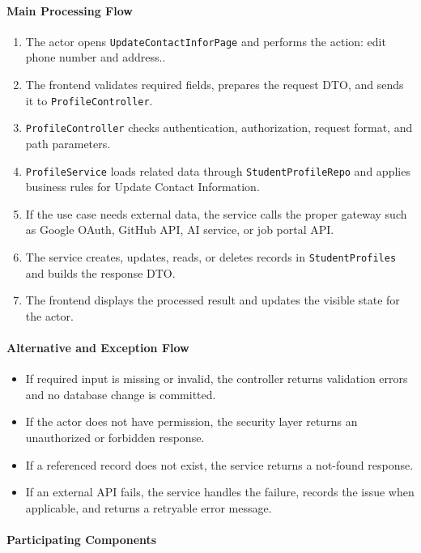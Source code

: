\paragraph{Main Processing Flow}

\begin{enumerate}
    \item The actor opens \texttt{UpdateContactInforPage} and performs the action: edit phone number and address..
    \item The frontend validates required fields, prepares the request DTO, and sends it to \texttt{ProfileController}.
    \item \texttt{ProfileController} checks authentication, authorization, request format, and path parameters.
    \item \texttt{ProfileService} loads related data through \texttt{StudentProfileRepo} and applies business rules for Update Contact Information.
    \item If the use case needs external data, the service calls the proper gateway such as Google OAuth, GitHub API, AI service, or job portal API.
    \item The service creates, updates, reads, or deletes records in \texttt{StudentProfiles} and builds the response DTO.
    \item The frontend displays the processed result and updates the visible state for the actor.
\end{enumerate}

\paragraph{Alternative and Exception Flow}

\begin{itemize}
    \item If required input is missing or invalid, the controller returns validation errors and no database change is committed.
    \item If the actor does not have permission, the security layer returns an unauthorized or forbidden response.
    \item If a referenced record does not exist, the service returns a not-found response.
    \item If an external API fails, the service handles the failure, records the issue when applicable, and returns a retryable error message.
\end{itemize}

\paragraph{Participating Components}

